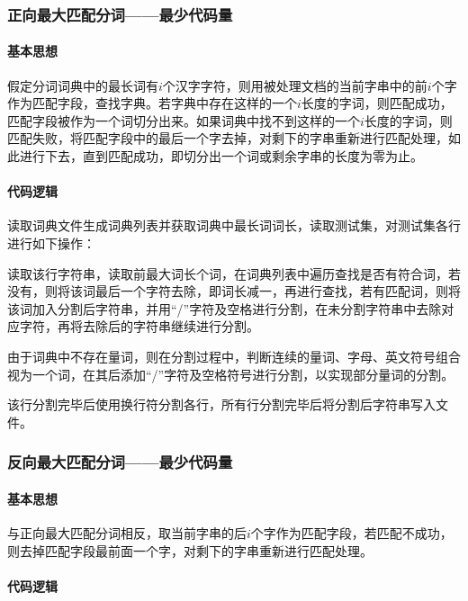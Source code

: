 \documentclass[11pt,a4paper]{article}
\begin{document}
	\subsubsection{正向最大匹配分词——最少代码量}
	
	\paragraph{基本思想}
	
	假定分词词典中的最长词有$i$个汉字字符，则用被处理文档的当前字串中的前$i$个字作为匹配字段，查找字典。若字典中存在这样的一个$i$长度的字词，则匹配成功，匹配字段被作为一个词切分出来。如果词典中找不到这样的一个$i$长度的字词，则匹配失败，将匹配字段中的最后一个字去掉，对剩下的字串重新进行匹配处理，如此进行下去，直到匹配成功，即切分出一个词或剩余字串的长度为零为止。~\citep{edmonds1965maximum}
	
	\paragraph{代码逻辑}
	
	读取词典文件生成词典列表并获取词典中最长词词长，读取测试集，对测试集各行进行如下操作：
	
	读取该行字符串，读取前最大词长个词，在词典列表中遍历查找是否有符合词，若没有，则将该词最后一个字符去除，即词长减一，再进行查找，若有匹配词，则将该词加入分割后字符串，并用“/”字符及空格进行分割，在未分割字符串中去除对应字符，再将去除后的字符串继续进行分割。
	
	由于词典中不存在量词，则在分割过程中，判断连续的量词、字母、英文符号组合视为一个词，在其后添加“/”字符及空格符号进行分割，以实现部分量词的分割。
	
	该行分割完毕后使用换行符分割各行，所有行分割完毕后将分割后字符串写入文件。
	
	\subsubsection{反向最大匹配分词——最少代码量}
	
	\paragraph{基本思想}
	
  	与正向最大匹配分词相反，取当前字串的后$i$个字作为匹配字段，若匹配不成功，则去掉匹配字段最前面一个字，对剩下的字串重新进行匹配处理。
	
	\paragraph{代码逻辑}
	
\end{document}
